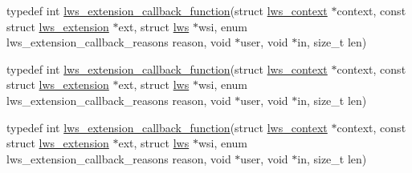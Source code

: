 \begin{DoxyCompactItemize}
\item 
typedef int \hyperlink{group__extensions_gaae7169b2cd346b34fa33d0250db2afd0}{lws\+\_\+extension\+\_\+callback\+\_\+function}(struct \hyperlink{structlws__context}{lws\+\_\+context} $\ast$context, const struct \hyperlink{structlws__extension}{lws\+\_\+extension} $\ast$ext, struct \hyperlink{structlws}{lws} $\ast$wsi, enum lws\+\_\+extension\+\_\+callback\+\_\+reasons reason, void $\ast$user, void $\ast$in, size\+\_\+t len)
\item 
typedef int \hyperlink{group__extensions_gaae7169b2cd346b34fa33d0250db2afd0}{lws\+\_\+extension\+\_\+callback\+\_\+function}(struct \hyperlink{structlws__context}{lws\+\_\+context} $\ast$context, const struct \hyperlink{structlws__extension}{lws\+\_\+extension} $\ast$ext, struct \hyperlink{structlws}{lws} $\ast$wsi, enum lws\+\_\+extension\+\_\+callback\+\_\+reasons reason, void $\ast$user, void $\ast$in, size\+\_\+t len)
\item 
typedef int \hyperlink{group__extensions_gaae7169b2cd346b34fa33d0250db2afd0}{lws\+\_\+extension\+\_\+callback\+\_\+function}(struct \hyperlink{structlws__context}{lws\+\_\+context} $\ast$context, const struct \hyperlink{structlws__extension}{lws\+\_\+extension} $\ast$ext, struct \hyperlink{structlws}{lws} $\ast$wsi, enum lws\+\_\+extension\+\_\+callback\+\_\+reasons reason, void $\ast$user, void $\ast$in, size\+\_\+t len)
\end{DoxyCompactItemize}
